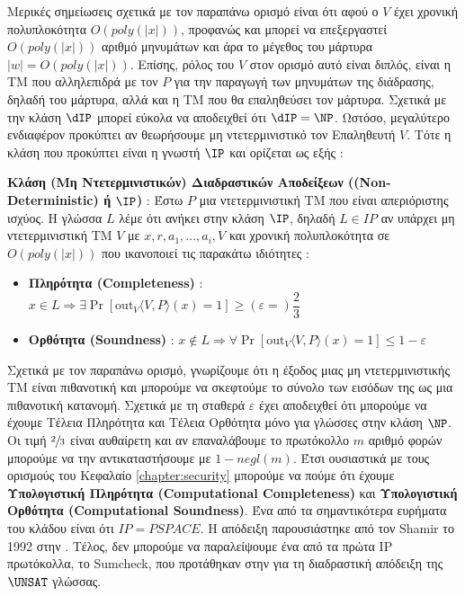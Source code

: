 Μερικές σημείωσεις σχετικά με τον παραπάνω ορισμό είναι ότι αφού ο $V$ έχει χρονική πολυπλοκότητα $O(poly(|x|))$, προφανώς και μπορεί να επεξεργαστεί $O(poly(|x|))$ αριθμό μηνυμάτων και άρα το μέγεθος του μάρτυρα $|w|=O(poly(|x|))$. Επίσης, ρόλος του $V$ στον ορισμό αυτό είναι διπλός, είναι η ΤΜ που αλληλεπιδρά με τον $P$ για την παραγωγή των μηνυμάτων της διάδρασης, δηλαδή του μάρτυρα, αλλά και η ΤΜ που θα επαληθεύσει τον μάρτυρα. Σχετικά με την κλάση  $\dIP$ μπορεί εύκολα να αποδειχθεί ότι $\dIP = \NP$. Ωστόσο, μεγαλύτερο ενδιαφέρον προκύπτει αν θεωρήσουμε μη ντετερμινιστικό τον Επαληθευτή $V$. Τότε η κλάση που προκύπτει είναι η γνωστή $\IP$ και ορίζεται ως εξής :

\begin{definition}
\textbf{Κλάση (Μη Ντετερμινιστικών) Διαδραστικών Αποδείξεων ((Non-Deter\-ministic)  ή $\IP$)} : Έστω $P$ μια ντετερμινιστική ΤΜ που είναι απεριόριστης ισχύος. Η γλώσσα $L$ λέμε ότι ανήκει στην κλάση $\IP$, δηλαδή $L \in IP$ αν υπάρχει μη ντετερμινιστική ΤΜ $V$ με $x, r, a_{1}, \ldots, a_{i}, V$ και χρονική πολυπλοκότητα σε $O(poly(|x|))$ που ικανοποιεί τις παρακάτω ιδιότητες :
\begin{itemize}
    \item \textbf{Πληρότητα (Completeness)} : $x \in L \Rightarrow \exists \operatorname{Pr}\left[\text {out}_{V}\langle V, P\rangle(x)=1\right] \geq (ε=) \dfrac{2}{3}$
    \item \textbf{Ορθότητα (Soundness)} : $x \notin L \Rightarrow \forall \operatorname{Pr}\left[\text {out}_{V}\langle V, P\rangle(x)=1\right] \leq 1 - ε$
\end{itemize}
\end{definition}

Σχετικά με τον παραπάνω ορισμό, γνωρίζουμε ότι η έξοδος μιας μη ντετερμινιστικής ΤΜ είναι πιθανοτική και μπορούμε να σκεφτούμε το σύνολο των εισόδων της ως μια πιθανοτική κατανομή. Σχετικά με τη σταθερά $ε$ έχει αποδειχθεί ότι μπορούμε να έχουμε Τέλεια Πληρότητα και Τέλεια Ορθότητα μόνο για γλώσσες στην κλάση $\NP$. Οι τιμή $\sfrac{2}{3}$ είναι αυθαίρετη και αν επαναλάβουμε το πρωτόκολλο $m$ αριθμό φορών μπορούμε να την αντικαταστήσουμε με $1-negl(m)$. Έτσι ουσιαστικά με τους ορισμούς του Κεφαλαίο \ref{chapter:security} μπορούμε να πούμε ότι έχουμε \textbf{Υπολογιστική Πληρότητα (Computational Completeness)} και \textbf{Υπολογιστική Ορθότητα (Computational Soundness)}. Ένα από τα σημαντικότερα ευρήματα του κλάδου είναι ότι $IP=PSPACE$. Η απόδειξη παρουσιάστηκε από τον Shamir το 1992 στην \cite{shamir1992ip}. Τέλος, δεν μπορούμε να παραλείψουμε ένα από τα πρώτα IP πρωτόκολλα, το Sumcheck, που προτάθηκαν στην \cite{lund1992algebraic} για τη διαδραστική απόδειξη της $\UNSAT$ γλώσσας.